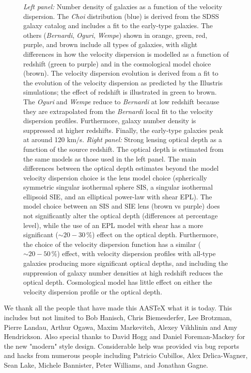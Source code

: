 \documentclass[linenumbers]{aastex631}
\begin{document}
\begin{figure}
  \caption{
    \emph{Left panel:} Number density of galaxies as a function of the velocity dispersion. %
    The \emph{Choi} distribution (blue) is derived from the SDSS galaxy catalog and includes a fit to the early-type galaxies. 
    The others (\emph{Bernardi}, \emph{Oguri}, \emph{Wempe}) shown in orange, green, red, purple, and brown include all types of galaxies, with slight differences in how the velocity dispersion is modelled as a function of redshift (green to purple) and in the cosmological model choice (brown). 
    The velocity dispersion evolution is derived from a fit to the evolution of the velocity dispersion as predicted by the Illustris simulations; the effect of redshift is illustrated in green to brown. 
    The \emph{Oguri} and \emph{Wempe} reduce to \emph{Bernardi} at low redshift because they are extrapolated from the \emph{Bernardi} local fit to the velocity dispersion profiles. 
    Furthermore, galaxy number density is suppressed at higher redshifts. 
    Finally, the early-type galaxies peak at around 120 km/s. 
    \emph{Right panel:} Strong lensing optical depth as a function of the source redshift. %
    The optical depth is estimated from the same models as those used in the left panel. 
    The main differences between the optical depth estimates beyond the model velocity dispersion choice is the lens model choice (spherically symmetric singular isothermal sphere SIS, a singular isothermal ellipsoid SIE, and an elliptical power-law with shear EPL). 
    The model choice between an SIS and SIE lens (brown vs purple) does not significantly alter the optical depth (differences at percentage level), 
    while the use of an EPL model with shear has a more significant ($\sim 20-30\,\%$) effect on the optical depth. 
    Furthermore, the choice of the velocity dispersion function has a similar ($\sim 20-50\,\%$) effect, with velocity dispersion profiles with all-type galaxies producing more significant optical depths, and including the suppression of galaxy number densities at high redshift reduces the optical depth. 
    Cosmological model has little effect on either the velocity dispersion profile or the optical depth.
  }
  \label{fig:optical_depth_summary}
\end{figure}


\begin{acknowledgments}
We thank all the people that have made this AASTeX what it is today.  This
includes but not limited to Bob Hanisch, Chris Biemesderfer, Lee Brotzman,
Pierre Landau, Arthur Ogawa, Maxim Markevitch, Alexey Vikhlinin and Amy
Hendrickson. Also special thanks to David Hogg and Daniel Foreman-Mackey
for the new "modern" style design. Considerable help was provided via bug
reports and hacks from numerous people including Patricio Cubillos, Alex
Drlica-Wagner, Sean Lake, Michele Bannister, Peter Williams, and Jonathan
Gagne.
\end{acknowledgments}


{}

\end{document}
